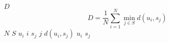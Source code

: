 \documentclass{article}
\begin{document}
$D$
\[D = \frac{1}{N} \sum_{i=1}^{N} \min_{j \in S} d(u_i, s_j)\]
$N$
$S$
$u_{i}$
$i$
$s_{j}$
$j$
$d(u_{i}, s_{j})$
$u_{i}$
$s_{j}$
\end{document}
